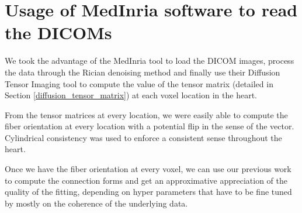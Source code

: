 \section{Usage of MedInria software to read the DICOMs}

We took the advantage of the MedInria tool to load the DICOM images, process the data through the Rician denoising method and finally use their Diffusion Tensor Imaging tool to compute the value of the tensor matrix (detailed in Section \ref{diffusion_tensor_matrix}) at each voxel location in the heart.

From the tensor matrices at every location, we were easily able to compute the fiber orientation at every location with a potential flip in the sense of the vector. Cylindrical consistency was used to enforce a consistent sense throughout the heart.

Once we have the fiber orientation at every voxel, we can use our previous work to compute the connection forms and get an approximative appreciation of the quality of the fitting, depending on hyper parameters that have to be fine tuned by mostly on the coherence of the underlying data.
